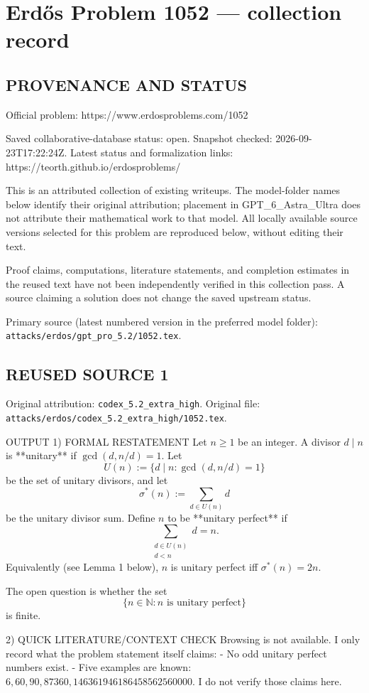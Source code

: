 \section*{Erd\H{o}s Problem 1052 --- collection record}

\subsection*{PROVENANCE AND STATUS}
Official problem: https://www.erdosproblems.com/1052

Saved collaborative-database status: open.
Snapshot checked: 2026-09-23T17:22:24Z.
Latest status and formalization links: https://teorth.github.io/erdosproblems/

This is an attributed collection of existing writeups. The model-folder names below identify their original attribution; placement in GPT\_6\_Astra\_Ultra does not attribute their mathematical work to that model. All locally available source versions selected for this problem are reproduced below, without editing their text.

Proof claims, computations, literature statements, and completion estimates in the reused text have not been independently verified in this collection pass. A source claiming a solution does not change the saved upstream status.

Primary source (latest numbered version in the preferred model folder): \texttt{attacks/erdos/gpt\_pro\_5.2/1052.tex}.

\subsection*{REUSED SOURCE 1}
Original attribution: \texttt{codex\_5.2\_extra\_high}.
Original file: \texttt{attacks/erdos/codex\_5.2\_extra\_high/1052.tex}.


OUTPUT
1) FORMAL RESTATEMENT
Let $n\ge 1$ be an integer. A divisor $d\mid n$ is **unitary** if $\gcd(d,n/d)=1$. Let
\[
U(n) := \{d \mid n : \gcd(d,n/d)=1\}
\]
be the set of unitary divisors, and let
\[
\sigma^*(n) := \sum_{d\in U(n)} d
\]
be the unitary divisor sum. Define $n$ to be **unitary perfect** if
\[
\sum_{\substack{d\in U(n) \\ d<n}} d = n.
\]
Equivalently (see Lemma 1 below), $n$ is unitary perfect iff $\sigma^*(n)=2n$.

The open question is whether the set
\[
\{n\in \mathbb{N} : n \text{ is unitary perfect}\}
\]
is finite.

2) QUICK LITERATURE/CONTEXT CHECK
Browsing is not available. I only record what the problem statement itself claims:
- No odd unitary perfect numbers exist.
- Five examples are known: $6,60,90,87360,146361946186458562560000$.
I do not verify those claims here.

